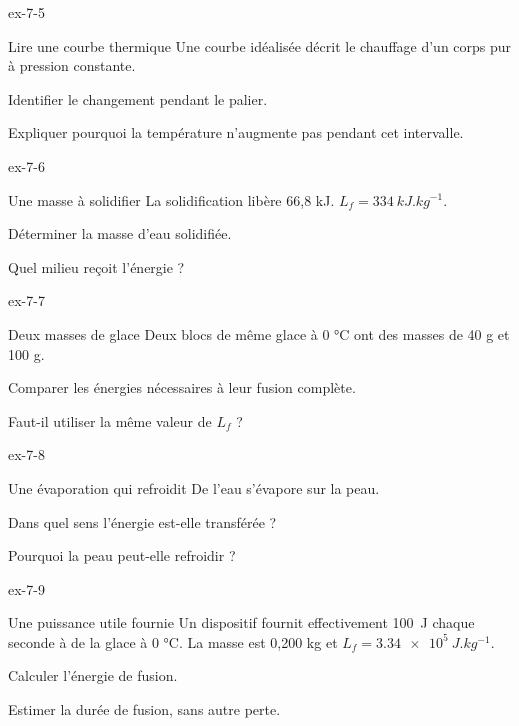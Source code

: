 \begin{blocLivre}{ex-7-5}\begin{exercice}[2]{Lire une courbe thermique}
Une courbe idéalisée décrit le chauffage d’un corps pur à pression constante.
\begin{questions}
\item Identifier le changement pendant le palier.
\item Expliquer pourquoi la température n’augmente pas pendant cet intervalle.
\end{questions}
\end{exercice}\end{blocLivre}
\begin{blocLivre}{ex-7-6}\begin{exercice}[2]{Une masse à solidifier}
La solidification libère 66,8 kJ. $L_f=\qty{334}{kJ.kg^{-1}}$.
\begin{questions}
\item Déterminer la masse d’eau solidifiée.
\item Quel milieu reçoit l’énergie ?
\end{questions}
\end{exercice}\end{blocLivre}
\begin{blocLivre}{ex-7-7}\begin{exercice}[2]{Deux masses de glace}
Deux blocs de même glace à 0 °C ont des masses de 40 g et 100 g.
\begin{questions}
\item Comparer les énergies nécessaires à leur fusion complète.
\item Faut-il utiliser la même valeur de $L_f$ ?
\end{questions}
\end{exercice}\end{blocLivre}
\begin{blocLivre}{ex-7-8}\begin{exercice}[2]{Une évaporation qui refroidit}
De l’eau s’évapore sur la peau.
\begin{questions}
\item Dans quel sens l’énergie est-elle transférée ?
\item Pourquoi la peau peut-elle refroidir ?
\end{questions}
\end{exercice}\end{blocLivre}
\begin{blocLivre}{ex-7-9}\begin{exercice}[3]{Une puissance utile fournie}
Un dispositif fournit effectivement \qty{100}{J} chaque seconde à de la glace à 0 °C. La masse est 0,200 kg et $L_f=\qty{3,34e5}{J.kg^{-1}}$.
\begin{questions}
\item Calculer l’énergie de fusion.
\item Estimer la durée de fusion, sans autre perte.
\end{questions}
\end{exercice}\end{blocLivre}
